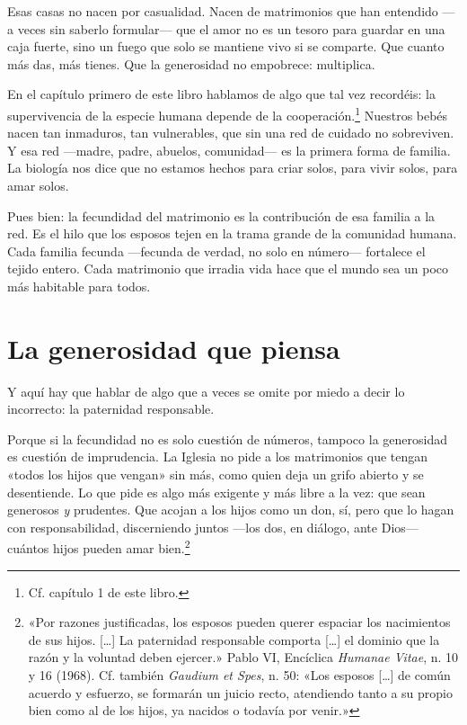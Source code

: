 Esas casas no nacen por casualidad. Nacen de matrimonios que han entendido ---a veces sin saberlo formular--- que el amor no es un tesoro para guardar en una caja fuerte, sino un fuego que solo se mantiene vivo si se comparte. Que cuanto más das, más tienes. Que la generosidad no empobrece: multiplica.

En el capítulo primero de este libro hablamos de algo que tal vez recordéis: la supervivencia de la especie humana depende de la cooperación.\footnote{Cf. capítulo 1 de este libro.} Nuestros bebés nacen tan inmaduros, tan vulnerables, que sin una red de cuidado no sobreviven. Y esa red ---madre, padre, abuelos, comunidad--- es la primera forma de familia. La biología nos dice que no estamos hechos para criar solos, para vivir solos, para amar solos.

Pues bien: la fecundidad del matrimonio es la contribución de esa familia a la red. Es el hilo que los esposos tejen en la trama grande de la comunidad humana. Cada familia fecunda ---fecunda de verdad, no solo en número--- fortalece el tejido entero. Cada matrimonio que irradia vida hace que el mundo sea un poco más habitable para todos.

\section{La generosidad que piensa}

Y aquí hay que hablar de algo que a veces se omite por miedo a decir lo incorrecto: la paternidad responsable.

Porque si la fecundidad no es solo cuestión de números, tampoco la generosidad es cuestión de imprudencia. La Iglesia no pide a los matrimonios que tengan «todos los hijos que vengan» sin más, como quien deja un grifo abierto y se desentiende. Lo que pide es algo más exigente y más libre a la vez: que sean generosos \emph{y} prudentes. Que acojan a los hijos como un don, sí, pero que lo hagan con responsabilidad, discerniendo juntos ---los dos, en diálogo, ante Dios--- cuántos hijos pueden amar bien.\footnote{«Por razones justificadas, los esposos pueden querer espaciar los nacimientos de sus hijos. [\ldots] La paternidad responsable comporta [\ldots] el dominio que la razón y la voluntad deben ejercer.» Pablo VI, Encíclica \textit{Humanae Vitae}, n. 10 y 16 (1968). Cf. también \textit{Gaudium et Spes}, n. 50: «Los esposos [\ldots] de común acuerdo y esfuerzo, se formarán un juicio recto, atendiendo tanto a su propio bien como al de los hijos, ya nacidos o todavía por venir.»}

